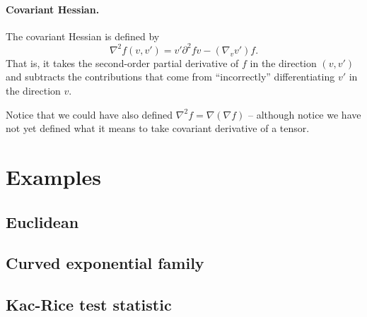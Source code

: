 \documentclass{article}
\begin{document}
	\paragraph{Covariant Hessian.}
	The covariant Hessian is defined by
	\begin{equation}
		\label{eqn:covariant-hessian}
		\nabla^2 f(v,v') = v' \partial^2 f v - (\nabla_v v')f.
	\end{equation}
	That is, it takes the second-order partial derivative of $f$ in the direction $(v,v')$ and subtracts the contributions that come from ``incorrectly'' differentiating $v'$ in the direction $v$. 
	
	Notice that we could have also defined $\nabla^2 f = \nabla(\nabla f)$ -- although notice we have not yet defined what it means to take covariant derivative of a tensor. 
	
	
	\section{Examples}
	
	\subsection{Euclidean}
	
	\subsection{Curved exponential family}
	
	\subsection{Kac-Rice test statistic}
	
\end{document}
